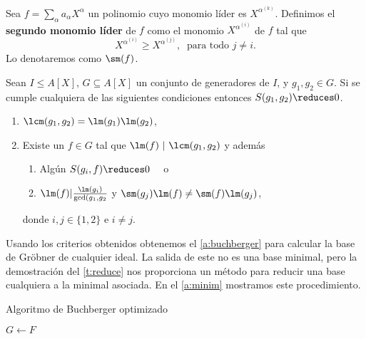 \begin{definicion}
    Sea $f= \sum_{\alpha} a_{\alpha} X^{\alpha}$ un polinomio cuyo monomio líder es $X^{\alpha^{(k)}}$. Definimos el \textbf{segundo monomio líder} de $f$ como el monomio $X^{\alpha^{(i)}}$ de $f$ tal que
    \begin{equation*}
        X^{\alpha^{(i)}} \ge X^{\alpha^{(j)}},\ \text{ para todo } j\neq i. 
    \end{equation*}
    Lo denotaremos como $\sm(f)$.
\end{definicion}
\begin{teorema}\label{t:criterios}
    Sean $I\le A[X]$, $G\subseteq A[X]$ un conjunto de generadores de $I$, y $g_1,g_2 \in G$. Si se cumple cualquiera de las siguientes condiciones entonces  $S(g_1,g_2)\reduces 0$.
    \begin{enumerate}
        \item $\lcm(g_1,g_2) = \lm(g_1)\lm(g_2)$,
        \item Existe un $f\in G$ tal que $\lm(f)\ \vert\ \lcm(g_1,g_2)$ y además
        \begin{enumerate}
            \item Algún $S(g_i,f)\reduces 0\quad$ o
            \item $\lm(f)\vert \frac{\lm(g_i)}{\gcd(g_1,g_2}$ y $\sm(g_j)\lm(f) \neq \sm(f)\lm(g_j)$,
        \end{enumerate}
        donde $i,j\in\{1,2\}$ e $i\neq j$.
    \end{enumerate}
    
\end{teorema}

Usando los criterios obtenidos obtenemos el \autoref{a:buchberger} para calcular la base de Gröbner de cualquier ideal. La salida de este no es una base minimal, pero la demostración del \autoref{t:reduce} nos proporciona un método para reducir una base cualquiera a la minimal asociada. En el \autoref{a:minim} mostramos este procedimiento.\newline

\begin{algorithm}[hbt!]
    \caption{Algoritmo de Buchberger optimizado}\label{a:buchberger}

    $G\gets F$\;


\end{algorithm}

